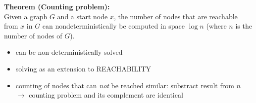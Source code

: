 \documentclass[a4]{scrartcl}
\begin{document}
\textbf{Theorem (Counting problem):} \\
Given a graph $G$ and a start node $x$, the number of nodes that are reachable from $x$ in $G$ can nondeterministically be computed in space
$\log n$ (where $n$ is the number of nodes of $G$). \\



\begin{itemize}
\item can be non-deterministically solved
\item solving as an extension to REACHABILITY
\item counting of nodes that can \textit{not} be reached similar: substract result from $n$ \\
$\rightarrow$ counting problem and its complement are identical
\end{itemize}
\end{document}
